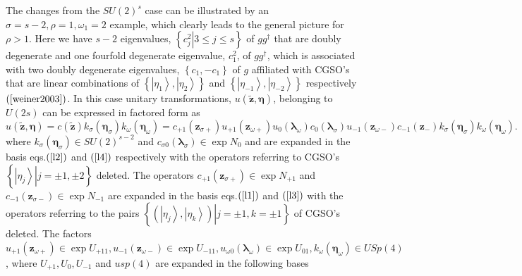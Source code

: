\documentclass[aps,preprint]{revtex4}%
\begin{document}
The changes from the $SU\left(  2\right)  ^{s}$ case can be illustrated by an
$\sigma=s-2,\rho=1,\omega_{1}=2$ example, which clearly leads to the general
picture for $\rho>1$. Here we have $s-2$ eigenvalues, $\left\{  \left.
c_{j}^{2}\right\vert 3\leq j\leq s\right\}  $ of $gg^{\dag}$ that are doubly
degenerate and one fourfold degenerate eigenvalue, $c_{1}^{2}$, of $gg^{\dag}%
$, which is associated with two doubly degenerate eigenvalues, $\left\{
c_{1},-c_{1}\right\}  $ of $g$ affiliated with CGSO's that are linear
combinations of $\left\{  \left\vert \eta_{1}\right\rangle ,\left\vert
\eta_{2}\right\rangle \right\}  $ and $\left\{  \left\vert \eta_{-1}%
\right\rangle ,\left\vert \eta_{-2}\right\rangle \right\}  $ respectively
$\left(  \cite{weiner2003}\right)  $. In this case unitary transformations,
$u\left(  \mathbf{\tilde{z},\eta}\right)  $, belonging to $U\left(  2s\right)
$ can be expressed in factored form as
\begin{equation}
u\left(  \mathbf{\tilde{z},\eta}\right)  =c\left(  \mathbf{\tilde{z}}\right)
k_{\sigma}\left(  \mathbf{\eta}_{\sigma}\right)  k_{\omega}\left(
\mathbf{\eta}_{\omega}\right)  =c_{+1}\left(  \mathbf{z}_{\sigma+}\right)
u_{+1}\left(  \mathbf{z}_{\omega+}\right)  u_{0}\left(  \mathbf{\lambda
}_{\omega}\right)  c_{0}\left(  \mathbf{\lambda}_{\sigma}\right)
u_{-1}\left(  \mathbf{z}_{\omega-}\right)  c_{-1}\left(  \mathbf{z}%
_{-}\right)  k_{\sigma}\left(  \mathbf{\eta}_{\sigma}\right)  k_{\omega
}\left(  \mathbf{\eta}_{\omega}\right)  . \label{gpprod}%
\end{equation}
where $k_{\sigma}\left(  \mathbf{\eta}_{\sigma}\right)  \in SU\left(
2\right)  ^{s-2}$ and $c_{\sigma0}\left(  \mathbf{\lambda}_{\sigma}\right)
\in\exp N_{0}$ and are expanded in the basis eqs.$\left(  \ref{l2}\right)  $
and $\left(  \ref{l4}\right)  $ respectively with the operators referring to
CGSO's $\left\{  \left.  \left\vert \eta_{j}\right\rangle \right\vert
j=\pm1,\pm2\right\}  $ deleted. The operators $c_{+1}\left(  \mathbf{z}%
_{\sigma+}\right)  \in\exp N_{+1}$ and $c_{-1}\left(  \mathbf{z}_{\sigma
-}\right)  \in\exp N_{-1}$ are expanded in the basis eqs.$\left(
\ref{l1}\right)  $ and $\left(  \ref{l3}\right)  $ with the operators
referring to the pairs $\left\{  \left.  \left(  \left\vert \eta
_{j}\right\rangle ,\left\vert \eta_{k}\right\rangle \right)  \right\vert
j=\pm1,k=\pm1\right\}  $ of CGSO's deleted. The factors $u_{+1}\left(
\mathbf{z}_{\omega+}\right)  \in\exp U_{+11},u_{-1}\left(  \mathbf{z}%
_{\omega-}\right)  \in\exp U_{-11},u_{\omega0}\left(  \mathbf{\lambda}%
_{\omega}\right)  \in\exp U_{01},k_{\omega}\left(  \mathbf{\eta}_{\omega
}\right)  \in USp\left(  4\right)  $, where $U_{+1},U_{0},U_{-1}$ and
$usp\left(  4\right)  $ are expanded in the following bases%
\end{document}
